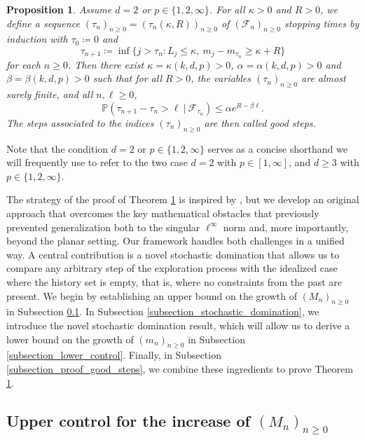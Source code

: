 \documentclass[a4paper, 11pt]{article}
\theoremstyle{plain}
\newtheorem{Proposition}[Theorem]{Proposition}
\theoremstyle{definition}
\renewcommand{\P}{\mathbb{P}}
\numberwithin{equation}{section}
\begin{document}
\begin{Proposition}
    \label{thm_good_steps}
    Assume $d=2$ or $p\in\{1, 2, \infty\}$. For all $\kappa>0$ and $R>0$, we define a sequence $(\tau_n)_{n\geq 0}=(\tau_n(\kappa, R))_{n\geq 0}$ of $(\mathcal F_n)_{n\geq 0}$ stopping times by induction with $\tau_0\coloneqq0$ and
        \[\tau_{n+1}\coloneqq\inf\{j>\tau_n:L_j\leq\kappa,~ m_j-m_{\tau_n}\geq\kappa+R\}\]
    for each $n\geq0$. Then there exist $\kappa=\kappa(k, d, p)>0$, $\alpha=\alpha(k, d, p)>0$ and $\beta=\beta(k, d, p)>0$ such that for all $R>0$, the variables $(\tau_n)_{n\geq 0}$ are almost surely finite, and all $n,\ell\geq0$,
        \[\P(\tau_{n+1}-\tau_n>\ell~\vert~\mathcal F_{\tau_n})\leq \alpha e^{R-\beta \ell}.\]
    The steps associated to the indices $(\tau_n)_{n\geq 0}$ are then called \emph{good steps}.
\end{Proposition}

Note that the condition $d=2$ or $p\in\{1, 2, \infty\}$ serves as a concise shorthand we will frequently use to refer to the two case $d=2$ with $p\in[1, \infty]$, and $d\geq3$ with $p\in\{1, 2,\infty\}$.

The strategy of the proof of Theorem \ref{thm_good_steps} is inspired by \cite{Dsf2d}, but we develop an original approach that overcomes the key mathematical obstacles that previously prevented generalization both to the singular $\ell^\infty$ norm and, more importantly, beyond the planar setting. Our framework handles both challenges in a unified way. A central contribution is a novel stochastic domination that allows us to compare any arbitrary step of the exploration process with the idealized case where the history set is empty, that is, where no constraints from the past are present. We begin by establishing an upper bound on the growth of $(M_n)_{n\geq0}$ in Subsection \ref{subsection_upper_control}. In Subsection \ref{subsection_stochastic_domination}, we introduce the novel stochastic domination result, which will allow us to derive a lower bound on the growth of $(m_n)_{n\geq0}$ in Subsection \ref{subsection_lower_control}. Finally, in Subsection \ref{subsection_proof_good_steps}, we combine these ingredients to prove Theorem \ref{thm_good_steps}.


\subsection{Upper control for the increase of $(M_n)_{n\geq0}$}

\label{subsection_upper_control}
\end{document}
